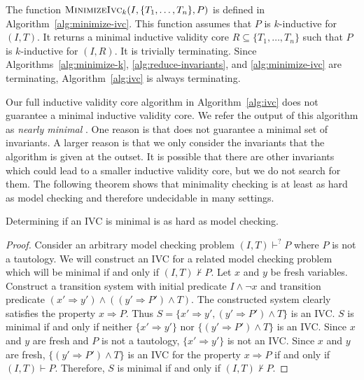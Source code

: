 The function $\textsc{MinimizeIvc}_k(I, \{T_1, \ldots, T_n\}, P)$ is defined in
Algorithm~\ref{alg:minimize-ivc}. This function assumes that $P$ is
$k$-inductive for $(I, T)$. It returns a minimal inductive validity
core $R \subseteq \{T_1, \ldots, T_n\}$ such that $P$ is $k$-inductive
for $(I, R)$. It is trivially terminating. Since
Algorithms~\ref{alg:minimize-k}, \ref{alg:reduce-invariants}, and
\ref{alg:minimize-ivc} are terminating, Algorithm~\ref{alg:ivc} is
always terminating.

Our full inductive validity core algorithm in Algorithm~\ref{alg:ivc}
does not guarantee a minimal inductive validity core. We refer the output of this algorithm as \emph{nearly minimal} \ivc .
 One reason is
that \reduceinv does not guarantee a minimal set of invariants. A
larger reason is that we only consider the invariants that the
algorithm is given at the outset. It is possible that there are other
invariants which could lead to a smaller inductive validity core, but
we do not search for them. The
following theorem shows that minimality checking is at least as hard
as model checking and therefore undecidable in many settings.

\begin{theorem}
\label{thm:minimal-hard}
Determining if an IVC is minimal is as hard as model checking.
\end{theorem}
\begin{proof}
Consider an arbitrary model checking problem $(I, T)\vdash^? P$ where
$P$ is not a tautology. We will construct an IVC for a related model
checking problem which will be minimal if and only if $(I, T)\nvdash
P$. Let $x$ and $y$ be fresh variables. Construct a transition system
with initial predicate $I\land \neg x$ and transition predicate $(x'
\Rightarrow y') \land ((y' \Rightarrow P') \land T)$. The constructed
system clearly satisfies the property $x \Rightarrow P$. Thus $S = \{x'
\Rightarrow y', (y' \Rightarrow P') \land T\}$ is an IVC. $S$ is
minimal if and only if neither $\{x' \Rightarrow y'\}$ nor $\{(y'
\Rightarrow P') \land T\}$ is an IVC. Since $x$ and $y$ are fresh and
$P$ is not a tautology, $\{x' \Rightarrow y'\}$ is not an IVC. Since
$x$ and $y$ are fresh, $\{(y' \Rightarrow P') \land T\}$ is an IVC for
the property $x \Rightarrow P$ if and only if $(I, T)\vdash P$.
Therefore, $S$ is minimal if and only if $(I, T)\nvdash P$.
\end{proof}

